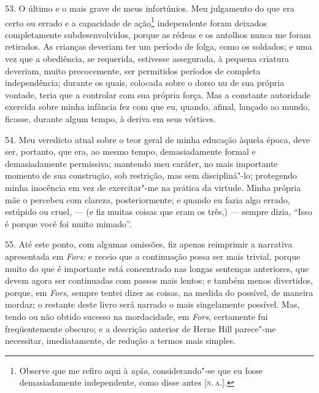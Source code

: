 53. O último e o mais grave de meus infortúnios. Meu julgamento do que
era certo ou errado e a capacidade de ação\footnote{Observe que me
  refiro aqui à \emph{ação}, considerando"-se que eu fosse demasiadamente
  independente, como disse antes {[}\textsc{n.\,a.}{]}.} independente foram
deixados completamente subdesenvolvidos, porque as rédeas e os antolhos
nunca me foram retirados. As crianças deveriam ter um período de folga,
como os soldados; e uma vez que a obediência, se requerida, estivesse
assegurada, à pequena criatura deveriam, muito precocemente, ser
permitidos períodos de completa independência; durante os quais,
colocada sobre o dorso nu de sua própria vontade, teria que a controlar
com sua própria força. Mas a constante autoridade exercida sobre minha
infância fez com que eu, quando, afinal, lançado ao mundo, ficasse,
durante algum tempo, à deriva em seus vórtices.

54. Meu veredicto atual sobre o teor geral de minha educação àquela
época, deve ser, portanto, que era, ao mesmo tempo, demasiadamente
formal e demasiadamente permissiva; mantendo meu caráter, no mais
importante momento de sua construção, sob restrição, mas sem
discipliná"-lo; protegendo minha inocência em vez de exercitar"-me na
prática da virtude. Minha própria mãe o percebeu com clareza,
posteriormente; e quando eu fazia algo errado, estúpido ou cruel, --- (e
fiz muitas coisas que eram os três,) --- sempre dizia, ``Isso é porque
você foi muito mimado''.

55. Até este ponto, com algumas omissões, fiz apenas reimprimir a
narrativa apresentada em \emph{Fors:} e receio que a continuação possa
ser mais trivial, porque muito do que é importante está concentrado nas
longas sentenças anteriores, que devem agora ser continuadas com passos
mais lentos; e também menos divertidos, porque, em \emph{Fors,} sempre
tentei dizer as coisas, na medida do possível, de maneira mordaz; o
restante deste livro será narrado o mais singelamente possível. Mas,
tendo ou não obtido sucesso na mordacidade, em \emph{Fors}, certamente
fui freqüentemente obscuro; e a descrição anterior de Herne Hill
parece"-me necessitar, imediatamente, de redução a termos mais simples.

